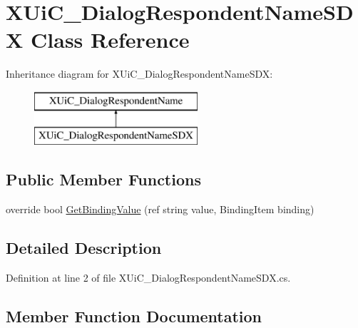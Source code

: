 \hypertarget{class_x_ui_c___dialog_respondent_name_s_d_x}{}\section{X\+Ui\+C\+\_\+\+Dialog\+Respondent\+Name\+S\+DX Class Reference}
\label{class_x_ui_c___dialog_respondent_name_s_d_x}
Inheritance diagram for X\+Ui\+C\+\_\+\+Dialog\+Respondent\+Name\+S\+DX\+:\begin{figure}[H]
\begin{center}
\leavevmode
\includegraphics[height=2.000000cm]{d2/d70/class_x_ui_c___dialog_respondent_name_s_d_x}
\end{center}
\end{figure}
\subsection*{Public Member Functions}
\begin{DoxyCompactItemize}
\item 
override bool \mbox{\hyperlink{class_x_ui_c___dialog_respondent_name_s_d_x_a59d072ca9b0063afc9cbbe1f8dc748e8}{Get\+Binding\+Value}} (ref string value, Binding\+Item binding)
\end{DoxyCompactItemize}


\subsection{Detailed Description}


Definition at line 2 of file X\+Ui\+C\+\_\+\+Dialog\+Respondent\+Name\+S\+D\+X.\+cs.



\subsection{Member Function Documentation}
\mbox{\label{class_x_ui_c___dialog_respondent_name_s_d_x_a59d072ca9b0063afc9cbbe1f8dc748e8}} 
